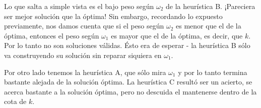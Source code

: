 Lo que salta a simple vista es el bajo peso según $\omega_2$ de la heurística B. ¡Pareciera ser mejor solución que la óptima! Sin embargo,
recordando lo expuesto previamente, nos damos cuenta que si el peso según $\omega_2$ es menor que el de la óptima, entonces el peso según
$\omega_1$ es mayor que el de la óptima, es decir, que $k$. Por lo tanto no son soluciones válidas.
Ésto era de esperar - la heurística B sólo va construyendo su solución sin reparar siquiera en $\omega_1$.

Por otro lado tenemos la heurística A, que sólo mira $\omega_1$ y por lo tanto termina bastante alejada de la solución óptima. La heurística
C resultó ser un acierto, se acerca bastante a la solución óptima, pero no descuida el mantenerse dentro de la cota de $k$.

